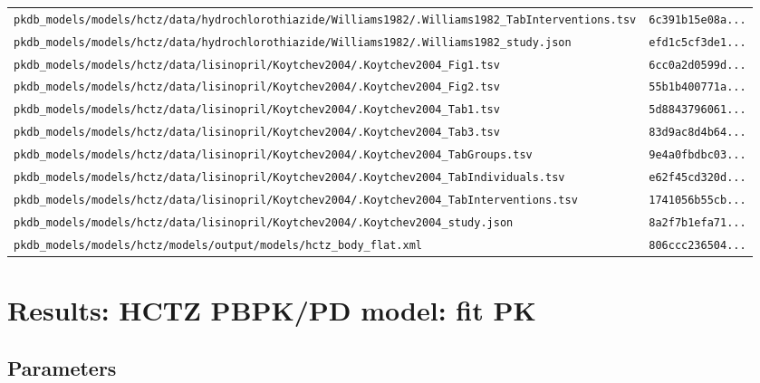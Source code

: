 \begin{longtable}{ll}
\texttt{pkdb\_models/models/hctz/data/hydrochlorothiazide/Williams1982/.Williams1982\_TabInterventions.tsv} & \texttt{6c391b15e08a...} \\
\texttt{pkdb\_models/models/hctz/data/hydrochlorothiazide/Williams1982/.Williams1982\_study.json} & \texttt{efd1c5cf3de1...} \\
\texttt{pkdb\_models/models/hctz/data/lisinopril/Koytchev2004/.Koytchev2004\_Fig1.tsv} & \texttt{6cc0a2d0599d...} \\
\texttt{pkdb\_models/models/hctz/data/lisinopril/Koytchev2004/.Koytchev2004\_Fig2.tsv} & \texttt{55b1b400771a...} \\
\texttt{pkdb\_models/models/hctz/data/lisinopril/Koytchev2004/.Koytchev2004\_Tab1.tsv} & \texttt{5d8843796061...} \\
\texttt{pkdb\_models/models/hctz/data/lisinopril/Koytchev2004/.Koytchev2004\_Tab3.tsv} & \texttt{83d9ac8d4b64...} \\
\texttt{pkdb\_models/models/hctz/data/lisinopril/Koytchev2004/.Koytchev2004\_TabGroups.tsv} & \texttt{9e4a0fbdbc03...} \\
\texttt{pkdb\_models/models/hctz/data/lisinopril/Koytchev2004/.Koytchev2004\_TabIndividuals.tsv} & \texttt{e62f45cd320d...} \\
\texttt{pkdb\_models/models/hctz/data/lisinopril/Koytchev2004/.Koytchev2004\_TabInterventions.tsv} & \texttt{1741056b55cb...} \\
\texttt{pkdb\_models/models/hctz/data/lisinopril/Koytchev2004/.Koytchev2004\_study.json} & \texttt{8a2f7b1efa71...} \\
\texttt{pkdb\_models/models/hctz/models/output/models/hctz\_body\_flat.xml} & \texttt{806ccc236504...} \\
\end{longtable}

\section{Results: HCTZ PBPK/PD model: fit PK}

\subsection{Parameters}

